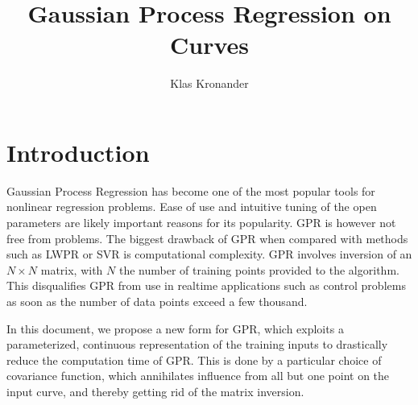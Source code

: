 \documentclass[]{article}
\author{Klas Kronander}
\title{Gaussian Process Regression on Curves}
\begin{document}
\maketitle

\section{Introduction}
\label{sec:intro}

Gaussian Process Regression has become one of the most popular tools for nonlinear regression problems. Ease of use and intuitive tuning of the open parameters are likely important reasons for its popularity. GPR is however not free from problems. The biggest drawback of GPR when compared with methods such as LWPR or SVR is computational complexity. GPR involves inversion of an $N \times N$ matrix, with $N$ the number of training points provided to the algorithm. This disqualifies GPR from use in realtime applications such as control problems as soon as the number of data points exceed a few thousand. 

In this document, we propose a new form for GPR, which exploits a parameterized, continuous representation of the training inputs to drastically reduce the computation time of GPR. This is done by a particular choice of covariance function, which annihilates influence from all but one point on the input curve, and thereby getting rid of the matrix inversion. 
\end{document}
